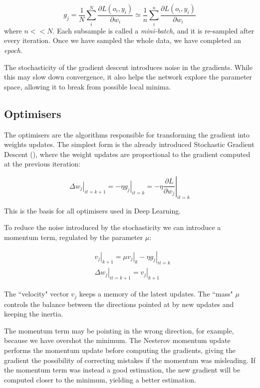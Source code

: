 \begin{equation*}
g_j = \frac{1}{N} \sum_i^N \frac{\partial L\left(o_i, y_i\right)}{\partial w_i} \simeq \frac{1}{n} \sum_i^n \frac{\partial L\left(o_i, y_i\right)}{\partial w_i}
\end{equation*}
where $n << N$.
Each subsample is called a \emph{mini-batch}, 
and it is re-sampled after every iteration.
Once we have sampled the whole data, we have completed an \emph{epoch}.

The stochasticity of the gradient descent introduces noise in the gradients.
While this may slow down convergence, it also helps the network explore the parameter space, allowing it to break from possible local minima.

\subsection{Optimisers}
The optimisers are the algorithms responsible for transforming the gradient into weights updates.
The simplest form is the already introduced Stochastic Gradient Descent (\SGD), \sidenote{\SGD}
where the weight updates are proportional to the gradient computed at the previous iteration:

\begin{equation*}
\left.\Delta w_j\right|_{it=k+1} = - \left.\eta g_j\right|_{it=k} = - \eta \left.\frac{\partial L}{\partial w_j}\right|_{it=k}
\end{equation*}

This is the basis for all optimisers used in Deep Learning.


To reduce the noise introduced by the stochasticity we can introduce a momentum term, regulated by the parameter $\mu$:

\begin{align*}
&\left.v_j\right|_{k+1} = \mu \left. v_j\right|_{k} - \left.\eta g_j\right|_{it=k}\\
&\left.\Delta w_j\right|_{it=k+1} = \left.v_j\right|_{k+1}
\end{align*}

The ``velocity" vector $v_j$ keeps a memory of the latest updates.
The ``mass" $\mu$ controls the balance between the directions pointed at by new updates and keeping the inertia.

The momentum term 
may be pointing in the wrong direction, for example, because we have overshot the minimum.
The Nesterov momentum update~\citep{nag} performs the momentum update before computing the gradients, giving the gradient the possibility of correcting mistakes if the momentum was misleading.
If the momentum term was instead a good estimation, the new gradient will be computed closer to the minimum, yielding a better estimation.

